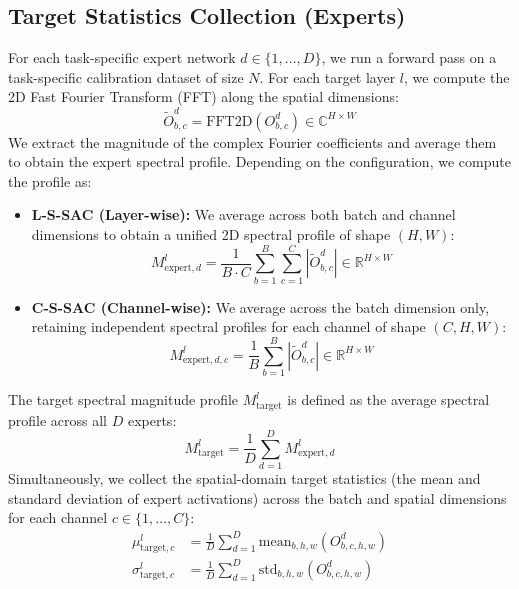 \documentclass{article}
\theoremstyle{plain}
\theoremstyle{definition}
\theoremstyle{remark}
\begin{document}
\subsection{Target Statistics Collection (Experts)}
For each task-specific expert network $d \in \{1, \dots, D\}$, we run a forward pass on a task-specific calibration dataset of size $N$. For each target layer $l$, we compute the 2D Fast Fourier Transform (FFT) along the spatial dimensions:
\begin{equation}
    \tilde{O}^d_{b,c} = \text{FFT2D}(O^d_{b,c}) \in \mathbb{C}^{H \times W}
\end{equation}
We extract the magnitude of the complex Fourier coefficients and average them to obtain the expert spectral profile. Depending on the configuration, we compute the profile as:
\begin{itemize}
    \item \textbf{L-S-SAC (Layer-wise):} We average across both batch and channel dimensions to obtain a unified 2D spectral profile of shape $(H, W)$:
    \begin{equation}
        M^l_{\text{expert}, d} = \frac{1}{B \cdot C} \sum_{b=1}^B \sum_{c=1}^C |\tilde{O}^d_{b,c}| \in \mathbb{R}^{H \times W}
    \end{equation}
    \item \textbf{C-S-SAC (Channel-wise):} We average across the batch dimension only, retaining independent spectral profiles for each channel of shape $(C, H, W)$:
    \begin{equation}
        M^l_{\text{expert}, d, c} = \frac{1}{B} \sum_{b=1}^B |\tilde{O}^d_{b,c}| \in \mathbb{R}^{H \times W}
    \end{equation}
\end{itemize}
The target spectral magnitude profile $M^l_{\text{target}}$ is defined as the average spectral profile across all $D$ experts:
\begin{equation}
    M^l_{\text{target}} = \frac{1}{D} \sum_{d=1}^D M^l_{\text{expert}, d}
\end{equation}
Simultaneously, we collect the spatial-domain target statistics (the mean and standard deviation of expert activations) across the batch and spatial dimensions for each channel $c \in \{1, \dots, C\}$:
\begin{align}
    \mu^l_{\text{target}, c} &= \frac{1}{D} \sum_{d=1}^D \text{mean}_{b,h,w}(O^d_{b,c,h,w}) \\
    \sigma^l_{\text{target}, c} &= \frac{1}{D} \sum_{d=1}^D \text{std}_{b,h,w}(O^d_{b,c,h,w})
\end{align}
\end{document}
